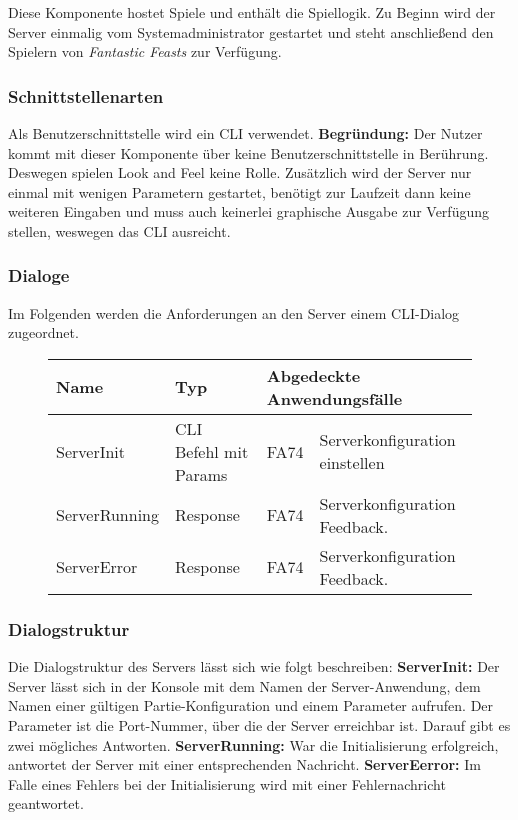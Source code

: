 Diese Komponente hostet Spiele und enthält die Spiellogik. Zu Beginn wird der Server einmalig vom Systemadministrator gestartet und steht anschließend den Spielern von \textit{Fantastic Feasts} zur Verfügung.

\subsubsection{Schnittstellenarten}
Als Benutzerschnittstelle wird ein CLI verwendet. \textbf{Begründung:} Der Nutzer kommt mit dieser Komponente über keine Benutzerschnittstelle in Berührung. Deswegen spielen Look and Feel keine Rolle. Zusätzlich wird der Server nur einmal mit wenigen Parametern gestartet, benötigt zur Laufzeit dann keine weiteren Eingaben und muss auch keinerlei graphische Ausgabe zur Verfügung stellen, weswegen das CLI ausreicht.

\subsubsection{Dialoge}
Im Folgenden werden die Anforderungen an den Server einem CLI-Dialog zugeordnet.

\begin{figure}[H]
    \centering
    \begin{tabular}{| l l l l |}
    \hline
    \textbf{Name} & \textbf{Typ} & \multicolumn{2}{l|}{\textbf{Abgedeckte Anwendungsfälle}} \\\hline
    ServerInit & CLI Befehl mit Params & FA74 & Serverkonfiguration einstellen \\\hline
    ServerRunning & Response & FA74 & Serverkonfiguration Feedback.\\\hline
    ServerError & Response & FA74 & Serverkonfiguration Feedback.\\\hline
    
    \end{tabular}
\end{figure}

\subsubsection{Dialogstruktur}  
Die Dialogstruktur des Servers lässt sich wie folgt beschreiben: \textbf{ServerInit:} Der Server lässt sich in der Konsole mit dem Namen der Server-Anwendung, dem Namen einer gültigen Partie-Konfiguration und einem Parameter aufrufen. Der Parameter ist die Port-Nummer, über die der Server erreichbar ist. Darauf gibt es zwei mögliches Antworten. \textbf{ServerRunning:} War die Initialisierung erfolgreich, antwortet der Server mit einer entsprechenden Nachricht. \textbf{ServerEerror:} Im Falle eines Fehlers bei der Initialisierung wird mit einer Fehlernachricht geantwortet.
